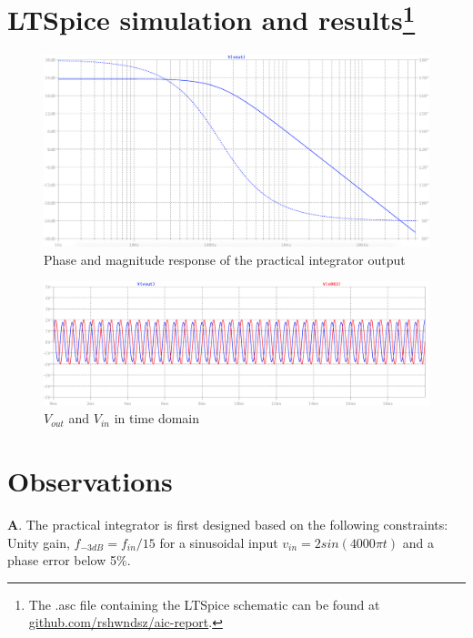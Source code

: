 \documentclass[12pt, titlepage]{article}
\theoremstyle{definition}
\begin{document}
  \newpage
  \section[LTSpice]{LTSpice simulation and results\footnote{The .asc file containing the LTSpice schematic can be found at \href{https://github.com/rshwndsz/aic-report/blob/master/lab5.asc}{github.com/rshwndsz/aic-report}.}}


    \begin{figure}[h]
      \centering
      \includegraphics[scale=0.25]{sim_plot_fd}
      \caption{Phase and magnitude response of the practical integrator output}
    \end{figure}
    \begin{figure}[h]
      \centering
      \includegraphics[scale=0.25]{sim_plot_td}
      \caption{$V_{out}$ and $V_{in}$ in time domain}
    \end{figure}


  \newpage
  \section{Observations}
    \textbf{A}. The practical integrator is first designed based on the following constraints:
    Unity gain, $f_{-3dB} = f_{in}/15$ for a sinusoidal input
    $v_{in} = 2 sin(4000\pi t)$ and a phase error below 5\%.
\end{document}
